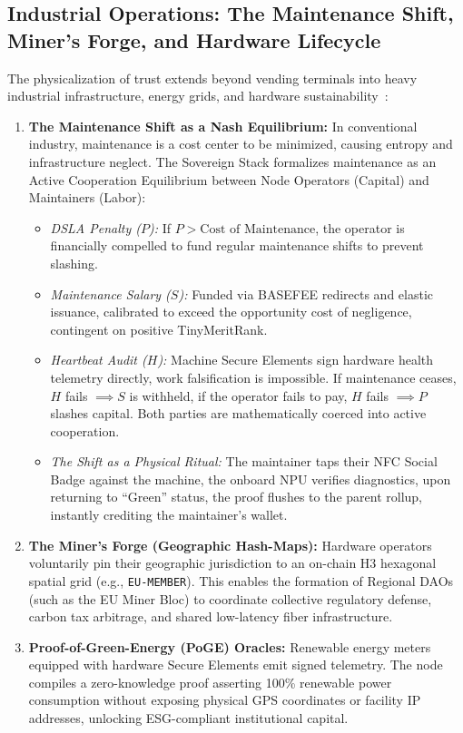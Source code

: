 \documentclass[a4paper,11pt,twoside,parskip=half-,headings=small]{scrartcl}
\newcommand{\code}[1]{\texttt{#1}}
\begin{document}
\subsection{Industrial Operations: The Maintenance Shift, Miner's Forge, and Hardware Lifecycle}
\label{sec:industrial_operations}

The physicalization of trust extends beyond vending terminals into heavy industrial infrastructure, energy grids, and hardware sustainability~\cite{blum2024lightbook}:
\begin{enumerate}[nosep]
  \item \textbf{The Maintenance Shift as a Nash Equilibrium:} In conventional industry, maintenance is a cost center to be minimized, causing entropy and infrastructure neglect. The Sovereign Stack formalizes maintenance as an Active Cooperation Equilibrium between Node Operators (Capital) and Maintainers (Labor):
  \begin{itemize}[nosep]
    \item \emph{DSLA Penalty ($P$):} If $P > \text{Cost of Maintenance}$, the operator is financially compelled to fund regular maintenance shifts to prevent slashing.
    \item \emph{Maintenance Salary ($S$):} Funded via BASEFEE redirects and elastic issuance, calibrated to exceed the opportunity cost of negligence, contingent on positive TinyMeritRank.
    \item \emph{Heartbeat Audit ($H$):} Machine Secure Elements sign hardware health telemetry directly, work falsification is impossible. If maintenance ceases, $H$ fails $\implies S$ is withheld, if the operator fails to pay, $H$ fails $\implies P$ slashes capital. Both parties are mathematically coerced into active cooperation.
    \item \emph{The Shift as a Physical Ritual:} The maintainer taps their NFC Social Badge against the machine, the onboard NPU verifies diagnostics, upon returning to ``Green'' status, the proof flushes to the parent rollup, instantly crediting the maintainer's wallet.
  \end{itemize}
  \item \textbf{The Miner's Forge (Geographic Hash-Maps):} Hardware operators voluntarily pin their geographic jurisdiction to an on-chain H3 hexagonal spatial grid (e.g., \code{EU-MEMBER}). This enables the formation of Regional DAOs (such as the EU Miner Bloc) to coordinate collective regulatory defense, carbon tax arbitrage, and shared low-latency fiber infrastructure.
  \item \textbf{Proof-of-Green-Energy (PoGE) Oracles:} Renewable energy meters equipped with hardware Secure Elements emit signed telemetry. The node compiles a zero-knowledge proof asserting 100\% renewable power consumption without exposing physical GPS coordinates or facility IP addresses, unlocking ESG-compliant institutional capital.

\end{enumerate}
\end{document}
